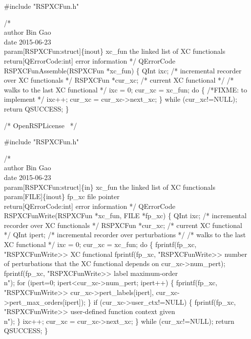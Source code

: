 #include "RSPXCFun.h"

/*%
    \\author Bin Gao
    \\date 2015-06-23
    \\param[RSPXCFun:struct]\{inout\} xc_fun the linked list of XC functionals
    \\return[QErrorCode:int] error information
*/
QErrorCode RSPXCFunAssemble(RSPXCFun *xc_fun)
\{
    QInt ixc;          /* incremental recorder over XC functionals */
    RSPXCFun *cur_xc;  /* current XC functional */
    /* walks to the last XC functional */
    ixc = 0;
    cur_xc = xc_fun;
    do \{
        /*FIXME: to implement */
        ixc++;
        cur_xc = cur_xc->next_xc;
    \} while (cur_xc!=NULL);
    return QSUCCESS;
\}

\nwendcode{}\endmoddef
/*
  \LA{}OpenRSPLicense~{\nwtagstyle{}}\RA{}
*/

#include "RSPXCFun.h"

/*%
    \\author Bin Gao
    \\date 2015-06-23
    \\param[RSPXCFun:struct]\{in\} xc_fun the linked list of XC functionals
    \\param[FILE]\{inout\} fp_xc file pointer
    \\return[QErrorCode:int] error information
*/
QErrorCode RSPXCFunWrite(RSPXCFun *xc_fun, FILE *fp_xc)
\{
    QInt ixc;          /* incremental recorder over XC functionals */
    RSPXCFun *cur_xc;  /* current XC functional */
    QInt ipert;        /* incremental recorder over perturbations */
    /* walks to the last XC functional */
    ixc = 0;
    cur_xc = xc_fun;
    do \{
        fprintf(fp_xc, "RSPXCFunWrite>> XC functional %
        fprintf(fp_xc,
                "RSPXCFunWrite>> number of perturbations that the XC functional depends on %
                cur_xc->num_pert);
        fprintf(fp_xc, "RSPXCFunWrite>> label           maximum-order\\n");
        for (ipert=0; ipert<cur_xc->num_pert; ipert++) \{
            fprintf(fp_xc,
                    "RSPXCFunWrite>>       %
                    cur_xc->pert_labels[ipert],
                    cur_xc->pert_max_orders[ipert]);
        \}
        if (cur_xc->user_ctx!=NULL) \{
            fprintf(fp_xc, "RSPXCFunWrite>> user-defined function context given\\n");
        \}
        ixc++;
        cur_xc = cur_xc->next_xc;
    \} while (cur_xc!=NULL);
    return QSUCCESS;
\}

